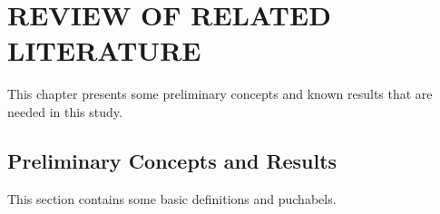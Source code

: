 \chapter{REVIEW OF RELATED LITERATURE}
\linespread{1.5}\selectfont This chapter presents some preliminary concepts and known results that are needed in this study.

\section{Preliminary Concepts and Results}
This section contains some basic definitions and puchabels.

